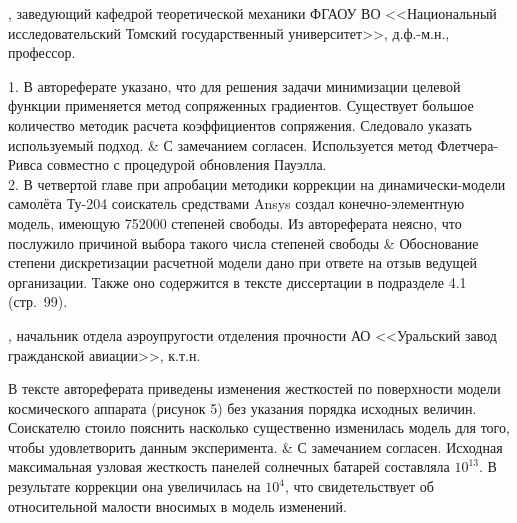\begin{frame}
	\beginSkip
	, заведующий кафедрой теоретической механики ФГАОУ ВО <<Национальный исследовательский Томский государственный университет>>, д.ф.-м.н., профессор.
	\begin{comtblr}{}
		1. В автореферате указано, что для решения задачи минимизации целевой функции применяется метод сопряженных градиентов. Существует большое количество методик расчета коэффициентов сопряжения. Следовало указать используемый подход.
		&
		С замечанием согласен. Используется метод Флетчера-Ривса совместно с процедурой обновления Пауэлла. \\
		2. В четвертой главе при апробации методики коррекции на динамически-модели самолёта Ту-204 соискатель средствами Ansys создал конечно-элементную модель, имеющую 752000 степеней свободы. Из автореферата неясно, что послужило причиной выбора такого числа степеней свободы
		&
		Обоснование степени дискретизации расчетной модели дано при ответе на отзыв ведущей организации. Также оно содержится в тексте диссертации в подразделе 4.1 (стр.~99). 
	\end{comtblr}
\end{frame}

\begin{frame}
	\beginSkip
	, начальник отдела аэроупругости отделения прочности АО <<Уральский завод гражданской авиации>>, к.т.н.
	\begin{comtblr}{17em}
		В тексте автореферата приведены изменения жесткостей по поверхности модели космического аппарата (рисунок 5) без указания порядка исходных величин. Соискателю стоило пояснить насколько существенно изменилась модель для того, чтобы удовлетворить данным эксперимента.
		&
		С замечанием согласен. Исходная максимальная узловая жесткость панелей солнечных батарей составляла $ 10 ^ {13} $. В результате коррекции она увеличилась на $ 10 ^ 4 $, что свидетельствует об относительной малости вносимых в модель изменений.
	\end{comtblr}
\end{frame}

